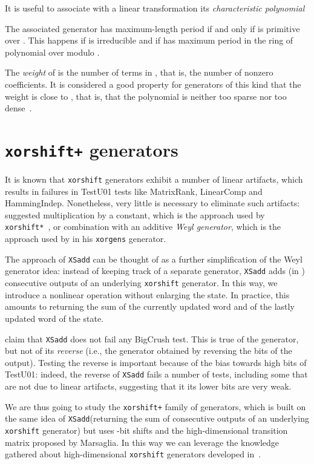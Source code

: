 \documentclass{acmsmalltr}
\newcommand{\xorshift}[1][]{\texttt{xorshift#1}\xspace}
\newcommand{\xorshifts}[1][]{\texttt{xorshift#1*}\xspace}
\newcommand{\xorshiftp}[1][]{\texttt{xorshift#1+}\xspace}
\newcommand{\xorgens}[1][]{\texttt{xorgens#1}\xspace}
\newcommand{\xsadd}{\texttt{XSadd}\xspace}
\begin{document}
It is useful to associate with a linear transformation  its \emph{characteristic polynomial}

The associated generator has maximum-length period if and only if  is
primitive over . This happens if  is irreducible and if  has
maximum period in the ring of polynomial over  modulo .

The \emph{weight} of  is the number
of terms in , that is, the number of nonzero coefficients. It is considered a good property for generators
of this kind that the weight is close to , that is, that the polynomial
is neither too sparse nor too dense~\cite{ComHCRBS}.

\section{{\fontsize{11pt}{11pt}\selectfont\xorshiftp} generators}

It is known that \xorshift generators exhibit a number of linear artifacts,
which results in failures in TestU01 tests like MatrixRank, LinearComp and
HammingIndep. Nonetheless, very little is necessary to eliminate such artifacts:
 suggested multiplication by a constant, which is the approach used
by \xorshifts~\cite{VigEEMXGS}, or combination with an additive \emph{Weyl generator}, which is
the approach used by  in his \xorgens
generator.

The approach of \xsadd can be thought of as a further simplification of the
Weyl generator idea: instead of keeping track of a separate generator, \xsadd
adds (in ) consecutive outputs of an underlying \xorshift
generator.
In this way, we introduce a nonlinear operation without
enlarging the state. In practice, this amounts to returning the sum of the currently
updated word and of the lastly updated word of the state. 

 claim that \xsadd does not fail
any BigCrush test. This is true of the generator, but not of its \emph{reverse}
(i.e., the generator obtained by reversing the bits of the output). Testing the reverse is important because
of the bias towards high bits of TestU01: indeed, the reverse of
\xsadd fails a number of tests, including some that are not due to linear
artifacts, suggesting that it its lower bits are very weak.

We are thus going to study the \xorshiftp family of
generators, which is built on the same idea of \xsadd (returning the sum of consecutive outputs of an
underlying \xorshift generator) but uses -bit shifts and the
high-dimensional transition matrix proposed by Marsaglia. In this way we can leverage the knowledge gathered about
high-dimensional \xorshift generators developed in~\cite{VigEEMXGS}.
 
\end{document}
